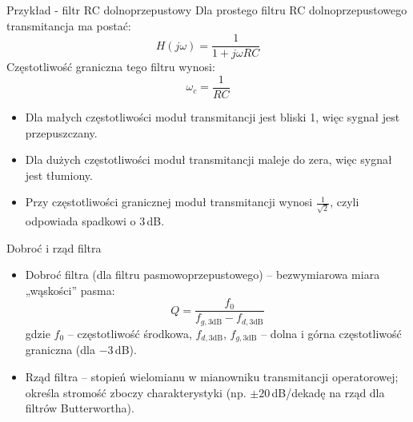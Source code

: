 \begin{frame}{Przykład - filtr RC dolnoprzepustowy}
	Dla prostego filtru RC dolnoprzepustowego transmitancja ma postać:
	\begin{equation*}
		H(j\omega)=\frac{1}{1+j\omega RC}
	\end{equation*}
	Częstotliwość graniczna tego filtru wynosi:
	\begin{equation*}
		\omega_c=\frac{1}{RC}
	\end{equation*}
	\begin{itemize}
		\item[\bt] Dla małych częstotliwości moduł transmitancji jest bliski 1, więc sygnał jest przepuszczany.
		\item[\bt] Dla dużych częstotliwości moduł transmitancji maleje do zera, więc sygnał jest tłumiony.
		\item[\bt] Przy częstotliwości granicznej moduł transmitancji wynosi $\frac{1}{\sqrt{2}}$, czyli odpowiada spadkowi o $3\,$dB.
	\end{itemize}
\end{frame}

\begin{frame}{Dobroć i rząd filtra}
	\begin{itemize}
		\item[\bt] Dobroć filtra (dla filtru pasmowoprzepustowego) – bezwymiarowa miara „wąskości” pasma:
		      \begin{equation*}
			      Q = \frac{f_0}{f_{g,3\mathrm{dB}} - f_{d,3\mathrm{dB}}}
		      \end{equation*}
		      gdzie $f_0$ – częstotliwość środkowa, $f_{d,3\mathrm{dB}}$, $f_{g,3\mathrm{dB}}$ – dolna i górna częstotliwość graniczna (dla $-3\,$dB).
		\item[\bt] Rząd filtra – stopień wielomianu w mianowniku transmitancji operatorowej; określa stromość zboczy charakterystyki (np. $\pm 20\,$dB/dekadę na rząd dla filtrów Butterwortha).
	\end{itemize}
\end{frame}

